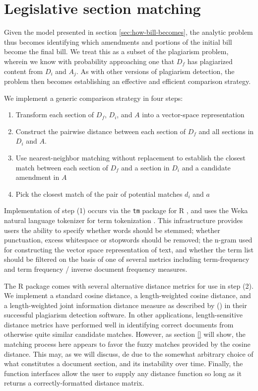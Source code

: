 \documentclass[11pt]{article}
\begin{document}
\section{Legislative section matching}
\label{sec:legisl-sect-match}

Given the model presented in section \ref{sec:how-bill-becomes}, the
analytic problem thus becomes identifying which amendments and
portions of the initial bill become the final bill. We treat this as a
subset of the plagiarism problem, wherein we know with probability
approaching one that $D_f$ has plagiarized content from $D_i$ and
$A_j$. As with other versions of plagiarism detection, the problem
then becomes establishing an effective and efficient comparison
strategy. 

We implement a generic comparison strategy in four steps:
\begin{enumerate}
\item Transform each section of $D_f$, $D_i$, and $A$ into a
  vector-space representation
\item Construct the pairwise distance between each section of $D_f$
  and all sections in $D_i$ and $A$.
\item Use nearest-neighbor matching without replacement to establish
  the closest match between each section of $D_f$ and a section in
  $D_i$ and a candidate amendment in $A$
\item Pick the closest match of the pair of potential matches $d_i$
  and $a$
\end{enumerate}


Implementation of step (1) occurs via the \texttt{tm} package for R \citep{meyer2008text},
and uses the Weka natural language tokenizer for term
tokenization \citep{hall2009weka}. This infrastructure provides users the ability to
specify whether words should be stemmed; whether punctuation, excess
whitespace or stopwords should be
removed; the n-gram used for constructing the vector space
representation of text, and whether the term list should be filtered
on the basis of one of several metrics including term-frequency and
term frequency / inverse document frequency measures. 

The R package comes with several alternative distance metrics for use
in step (2). We implement a standard cosine distance, a
length-weighted cosine distance, and a length-weighted joint
information distance measure as described by () in their successful
plagiarism detection software. In other applications, length-sensitive
distance metrics have performed well in identifying correct documents
from otherwise quite similar candidate matches. However, as section \ref{} will show,
the matching process here appears to favor the fuzzy matches provided
by the cosine distance. This may, as we will discuss, de due to the
somewhat arbitrary choice of what constitutes a document section, and
its instability over time. Finally, the function interfaces allow the
user to supply any distance function so long as it returns a
correctly-formatted distance matrix. 
\end{document}
